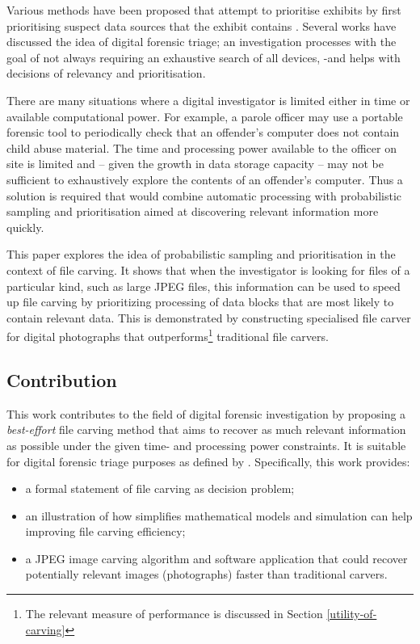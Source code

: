 \documentclass[final,5p,times,twocolumn,authoryear]{elsarticle}
\begin{document}
Various methods have been proposed that attempt to prioritise exhibits by first prioritising suspect data sources that the exhibit contains \citep{shaw2013practical, rogers2003role, overill2013triage}. Several works \citep{Koopmans2013,Casey2009} have discussed the idea of digital forensic triage; an investigation processes with the goal of not always requiring an exhaustive search of all devices, -and helps with decisions of relevancy and prioritisation.

There are many situations where a digital investigator is limited either in time or available computational power. For example, a parole officer may use a portable forensic tool to periodically check that an offender's computer does not contain child abuse material. The time and processing power available to the officer on site is limited and -- given the growth in data storage capacity -- may not be sufficient to exhaustively explore the contents of an offender's computer. Thus a solution is required that would combine automatic processing with probabilistic sampling and prioritisation aimed at discovering relevant information more quickly.

This paper explores the idea of probabilistic sampling and prioritisation in the context of file carving. It shows that when the investigator is looking for files of a particular kind, such as large JPEG files, this information can be used to speed up file carving by prioritizing processing of data blocks that are most likely to contain relevant data. This is demonstrated by constructing specialised file carver for digital photographs that outperforms\footnote{The relevant measure of performance is discussed in Section \ref{utility-of-carving}} traditional file carvers.

\subsection{Contribution}
This work contributes to the field of digital forensic investigation by proposing a \emph{best-effort} file carving method that aims to recover as much relevant information as possible under the given time- and processing power constraints. It is suitable for digital forensic triage purposes as defined by \citep{Koopmans2013}. Specifically, this work provides:
\begin{itemize}
	\item{a formal statement of file carving as decision problem;}
	\item{an illustration of how simplifies mathematical models and simulation can help improving file carving efficiency;}
	\item{a JPEG image carving algorithm and software application that could recover potentially relevant images (photographs) faster than traditional carvers.}
\end{itemize}
\end{document}
